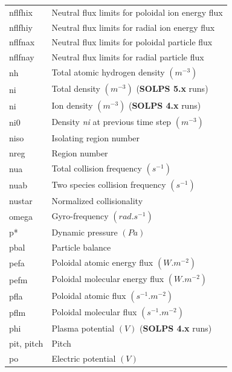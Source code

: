 \documentclass[a4paper,10pt]{report}
\newcommand\SOLPSfour{{\bf SOLPS 4.x} }
\newcommand\SOLPSfive{{\bf SOLPS 5.x} }
\begin{document}
\begin{center}
\begin{longtable}{|l|l|}
    nflfhix  & \index{b2plot, nflfhix} Neutral flux limits for poloidal ion energy flux \\
    nflfhiy  & \index{b2plot, nflfhiy} Neutral flux limits for radial ion energy flux \\
    nflfnax  & \index{b2plot, nflfnax} Neutral flux limits for poloidal particle flux \\
    nflfnay  & \index{b2plot, nflfnay} Neutral flux limits for radial particle flux \\
    nh       & \index{b2plot, nh} Total atomic hydrogen density $(m^{-3})$ \\
    ni       & \index{b2plot, ni} Total density $(m^{-3})$ (\SOLPSfive runs) \\
    ni       & \index{b2plot, ni} Ion density $(m^{-3})$ (\SOLPSfour runs) \\
    ni0      & \index{b2plot, ni0} Density {\em ni} at previous time step $(m^{-3})$ \\
    niso     & \index{b2plot, niso} Isolating region number \\
    nreg     & \index{b2plot, nreg} Region number \\
    nua      & \index{b2plot, nua} Total collision frequency $(s^{-1})$ \\
    nuab     & \index{b2plot, nuab} Two species collision frequency $(s^{-1})$ \\
    nustar   & \index{b2plot, nustar} Normalized collisionality \\
    omega    & \index{b2plot, omega} Gyro-frequency $(rad.s^{-1})$ \\
    p*       & \index{b2plot, p*} Dynamic pressure $(Pa)$ \\
    pbal     & \index{b2plot, pbal} Particle balance \\
    pefa     & \index{b2plot, pefa} Poloidal atomic energy flux $(W.m^{-2})$ \\
    pefm     & \index{b2plot, pefm} Poloidal molecular energy flux $(W.m^{-2})$ \\
    pfla     & \index{b2plot, pfla} Poloidal atomic flux $(s^{-1}.m^{-2})$ \\
    pflm     & \index{b2plot, pflm} Poloidal molecular flux $(s^{-1}.m^{-2})$ \\
    phi      & \index{b2plot, phi} Plasma potential $(V)$ (\SOLPSfour runs) \\
    pit, pitch      & \index{b2plot, pit} Pitch \index{b2plot, pitch} \\
    po       & \index{b2plot, po} Electric potential $(V)$ \\

\end{longtable}
\end{center}
\end{document}
